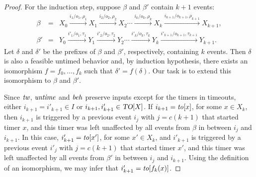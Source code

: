 \begin{proof}
For the induction step, suppose $\beta$ and $\beta'$ contain $k+1$ events:
\begin{eqnarray*}
\beta & = & X_0 \xrightarrow{i_1/o_1, \rho_1} X_1  \xrightarrow{i_2/o_2, \rho_2} X_2 \cdots \xrightarrow{i_k/o_k, \rho_k} X_{k}
 \xrightarrow{i_{k+1}/o_{k+1}, \rho_{k+1}} X_{k+1},\\
\beta' & = & Y_0 \xrightarrow{i'_1/o_1, \tau_1} Y_1  \xrightarrow{i'_2/o_2, \tau_2} Y_2 \cdots \xrightarrow{i'_k/o_k, \tau_k} Y_{k} 
 \xrightarrow{i'_{k+1}/o_{k+1}, \tau_{k+1}} Y_{k+1}.
\end{eqnarray*}
Let $\delta$ and $\delta'$ be the prefixes of $\beta$ and $\beta'$, respectively,
containing $k$ events. Then $\delta$ is also a feasible untimed behavior and, by
induction hypothesis, there exists an isomorphism $f = f_0 ,\ldots, f_k$ such that $\delta' = f(\delta)$.
Our task is to extend this isomorphism to $\beta$ and $\beta'$.

Since $\mathit{tw}$, $\mathit{untime}$ and $\mathit{beh}$ preserve inputs except for the timers in timeouts,
either $i_{k+1} = i'_{k+1} \in I$ or $i_{k+1}, i'_{k+1} \in\mbox{\sl TO}[X]$.
If $i_{k+1} = \mathit{to}[x]$, for some $x \in X_k$, then $i_{k+1}$ is triggered by a previous event $i_j$ with $j=c(k+1)$ that started
timer $x$, and this timer was left unaffected by all events from $\beta$ in between $i_j$ and $i_{k+1}$. In this case,
$i'_{k+1} = \mathit{to}[x']$, for some $x' \in X_k$, and $i'_{k+1}$ is triggered by a previous event $i'_j$ with $j=c(k+1)$ that started
timer $x'$, and this timer was left unaffected by all events from $\beta'$ in between $i_j$ and $i_{k+1}$.
Using the definition of an isomorphism, we may infer that $i'_{k+1} = \mathit{to}[f_k(x)]$.


\end{proof}
